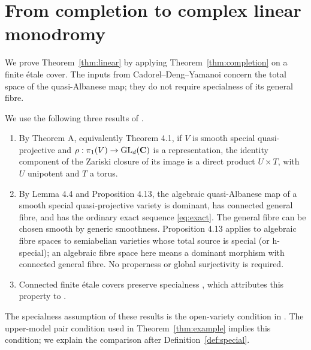 \section{From completion to complex linear monodromy}\label{sec:linear}

We prove Theorem~\ref{thm:linear} by applying
Theorem~\ref{thm:completion} on a finite \'etale cover. The inputs from
Cadorel--Deng--Yamanoi concern the total space of the quasi-Albanese map;
they do not require specialness of its general fibre.

We use the following three results of \cite{CDY2025}.
\begin{enumerate}[label=\textup{(\roman*)},leftmargin=2em]
\item By Theorem A, equivalently Theorem 4.1, if $V$ is smooth special
quasi-projective and $\rho:\pi_1(V)\to\operatorname{GL}_d(\mathbf C)$ is a representation,
the identity component of the Zariski closure of its image is a direct
product $U\times T$, with $U$ unipotent and $T$ a torus.
\item By Lemma 4.4 and Proposition 4.13, the algebraic quasi-Albanese
map of a smooth special quasi-projective variety is dominant, has
connected general fibre, and has the ordinary exact sequence
\eqref{eq:exact}. The general fibre can be chosen smooth by generic
smoothness. Proposition 4.13 applies to algebraic fibre spaces to
semiabelian varieties whose total source is special (or h-special);
an algebraic fibre space here means a dominant morphism with connected
general fibre. No properness or global surjectivity is required.
\item Connected finite \'etale covers preserve specialness
\cite[Theorem 3.1]{CDY2025}, which attributes this property to
\cite[Proposition 10.11]{Campana2011}.
\end{enumerate}
The specialness assumption of these results is the open-variety
condition in \cite[Definition 2.1]{CDY2025}. The upper-model pair
condition used in Theorem~\ref{thm:example} implies this condition;
we explain the comparison after Definition~\ref{def:special}.


